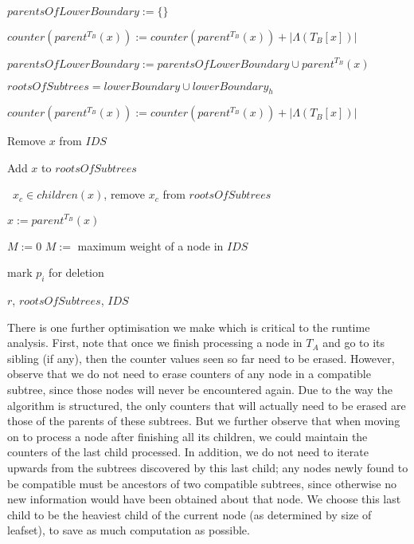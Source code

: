 \documentclass{article}
\newcommand{\leafset}{\Lambda}
\begin{document}
\begin{algorithm}
\begin{algorithmic}[1]
            \State $parentsOfLowerBoundary := \{\}$

                \State $counter(parent^{T_B}(x)) := counter(parent^{T_B}(x)) + |\leafset(T_B[x])|$

                \State $parentsOfLowerBoundary := parentsOfLowerBoundary \cup parent^{T_B}(x)$
            \EndFor

            \State $rootsOfSubtrees = lowerBoundary \cup lowerBoundary_h$

                \While{$counter(x) = |\leafset(T_B[x])|$ and $x \neq r$}
                    \State $counter(parent^{T_B}(x)) := counter(parent^{T_B}(x)) + |\leafset(T_B[x])|$

                    \State Remove $x$ from $IDS$

                    \State Add $x$ to $rootsOfSubtrees$

                    \State \algorithmicforall\ $x_c \in children(x)$, remove $x_c$ from $rootsOfSubtrees$

                    \State $x := parent^{T_B}(x)$
                \EndWhile
            \EndFor

                {$M := 0$}
                $M :=$ maximum weight of a node in $IDS$

            \IIf{$w(\leafset(T_A[p_i])) \leq M$}
                mark $p_i$ for deletion

            \State \Return $r$, $rootsOfSubtrees$, $IDS$
        \end{algorithmic}
    \end{algorithm}

    There is one further optimisation we make which is critical to the runtime analysis. First, note that once we finish processing a node in $T_A$ and go to its sibling (if any), then the counter values seen so far need to be erased. However, observe that we do not need to erase counters of any node in a compatible subtree, since those nodes will never be encountered again. Due to the way the algorithm is structured, the only counters that will actually need to be erased are those of the parents of these subtrees. But we further observe that when moving on to process a node after finishing all its children, we could maintain the counters of the last child processed. In addition, we do not need to iterate upwards from the subtrees discovered by this last child; any nodes newly found to be compatible must be ancestors of two compatible subtrees, since otherwise no new information would have been obtained about that node. We choose this last child to be the heaviest child of the current node (as determined by size of leafset), to save as much computation as possible.\\
\end{document}
